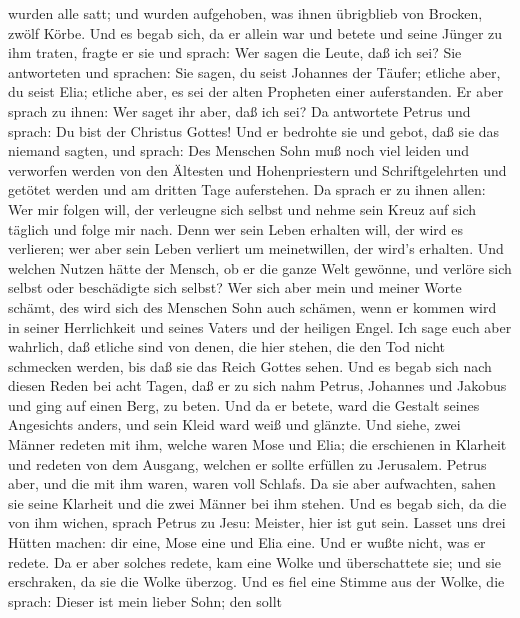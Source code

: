 wurden alle satt; und wurden aufgehoben, was ihnen übrigblieb von
Brocken, zwölf Körbe.  Und es begab sich, da er allein war
und betete und seine Jünger zu ihm traten, fragte er sie und sprach: Wer
sagen die Leute, daß ich sei?  Sie antworteten und
sprachen: Sie sagen, du seist Johannes der Täufer; etliche aber, du
seist Elia; etliche aber, es sei der alten Propheten einer auferstanden.
 Er aber sprach zu ihnen: Wer saget ihr aber, daß ich sei?
Da antwortete Petrus und sprach: Du bist der Christus Gottes!
 Und er bedrohte sie und gebot, daß sie das niemand sagten,
 und sprach: Des Menschen Sohn muß noch viel leiden und
verworfen werden von den Ältesten und Hohenpriestern und
Schriftgelehrten und getötet werden und am dritten Tage auferstehen.
 Da sprach er zu ihnen allen: Wer mir folgen will, der
verleugne sich selbst und nehme sein Kreuz auf sich täglich und folge
mir nach.  Denn wer sein Leben erhalten will, der wird es
verlieren; wer aber sein Leben verliert um meinetwillen, der wird's
erhalten.  Und welchen Nutzen hätte der Mensch, ob er die
ganze Welt gewönne, und verlöre sich selbst oder beschädigte sich
selbst?  Wer sich aber mein und meiner Worte schämt, des
wird sich des Menschen Sohn auch schämen, wenn er kommen wird in seiner
Herrlichkeit und seines Vaters und der heiligen Engel.  Ich
sage euch aber wahrlich, daß etliche sind von denen, die hier stehen,
die den Tod nicht schmecken werden, bis daß sie das Reich Gottes sehen.
 Und es begab sich nach diesen Reden bei acht Tagen, daß er
zu sich nahm Petrus, Johannes und Jakobus und ging auf einen Berg, zu
beten.  Und da er betete, ward die Gestalt seines
Angesichts anders, und sein Kleid ward weiß und glänzte. 
Und siehe, zwei Männer redeten mit ihm, welche waren Mose und Elia;
 die erschienen in Klarheit und redeten von dem Ausgang,
welchen er sollte erfüllen zu Jerusalem.  Petrus aber, und
die mit ihm waren, waren voll Schlafs. Da sie aber aufwachten, sahen sie
seine Klarheit und die zwei Männer bei ihm stehen.  Und es
begab sich, da die von ihm wichen, sprach Petrus zu Jesu: Meister, hier
ist gut sein. Lasset uns drei Hütten machen: dir eine, Mose eine und
Elia eine. Und er wußte nicht, was er redete.  Da er aber
solches redete, kam eine Wolke und überschattete sie; und sie
erschraken, da sie die Wolke überzog.  Und es fiel eine
Stimme aus der Wolke, die sprach: Dieser ist mein lieber Sohn; den sollt
